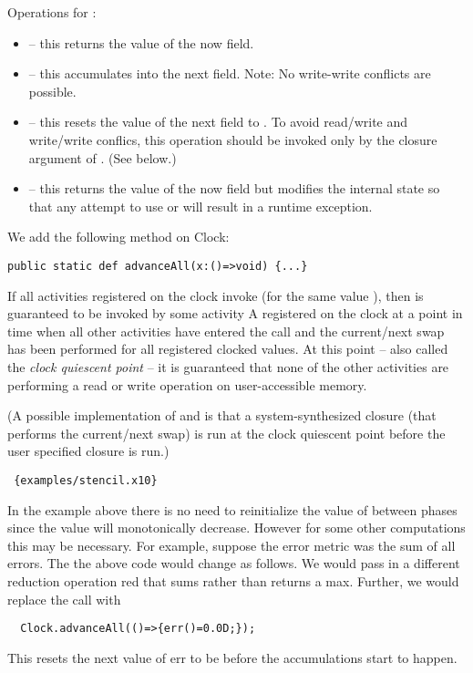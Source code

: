 Operations for :
\begin{itemize}
\item {} -- this returns the value of the now field. 
\item{} -- this accumulates  into the next field. Note: No
     write-write conflicts are possible.
\item{} -- this resets the value of the next field to . To avoid
     read/write and write/write conflics, this operation should be
     invoked only by the closure argument of
     . (See below.)
\item {} -- this returns the value of the now field but
     modifies the internal state so that any attempt to use  
     or  will result in a runtime exception.
\end{itemize}

We add the following method on Clock:
\begin{lstlisting}
public static def advanceAll(x:()=>void) {...}
\end{lstlisting}

If all activities registered on the clock invoke 
(for the same value ), then  is guaranteed to be
invoked by some activity A registered on the clock at a point in time
when all other activities have entered the  call
and the current/next swap has been performed for all registered
clocked values.  At this point -- also called the {\em clock quiescent
point} -- it is guaranteed that none of the other activities are
performing a read or write operation on user-accessible memory.

(A possible implementation of  and
 is that a system-synthesized closure (that
performs the current/next swap) is run at the clock quiescent point
before the user specified closure is run.)


\begin{example}
\begin{lstlisting}
 {examples/stencil.x10}
\end{lstlisting}
\end{example}


In the example above there is no need to reinitialize the value of
 between phases since the value will monotonically
decrease. However for some other computations this may be
necessary. For example, suppose the error metric was the sum of all
errors. The the above code would change as follows. We would pass in a
different reduction operation red that sums rather than returns a max.
Further, we would replace the  call with
\begin{lstlisting}
  Clock.advanceAll(()=>{err()=0.0D;});  
\end{lstlisting}

This resets the next value of err to be  before the accumulations
start to happen.


